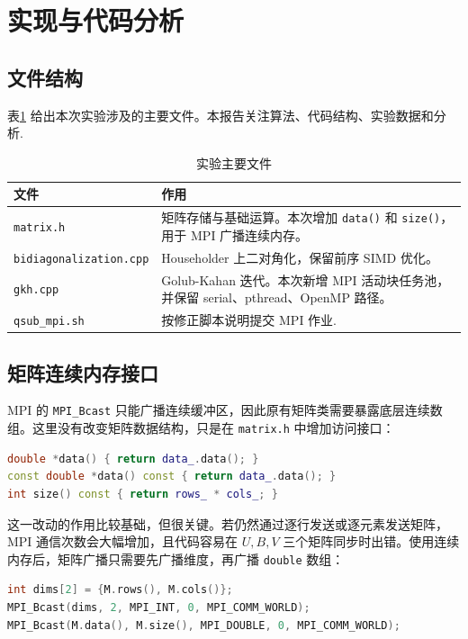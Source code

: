\documentclass[UTF8,a4paper,10pt,fontset=windows]{ctexart}
\begin{document}
\section{实现与代码分析}

\subsection{文件结构}
表\ref{tab:files} 给出本次实验涉及的主要文件。本报告关注算法、代码结构、实验数据和分析.

\begin{table}[H]
\centering
\begin{tabular}{p{}p{}}
\toprule
文件 & 作用 \\
\midrule
\texttt{matrix.h} & 矩阵存储与基础运算。本次增加 \texttt{data()} 和 \texttt{size()}，用于 MPI 广播连续内存。\\
\texttt{bidiagonalization.cpp} & Householder 上二对角化，保留前序 SIMD 优化。\\
\texttt{gkh.cpp} & Golub-Kahan 迭代。本次新增 MPI 活动块任务池，并保留 serial、pthread、OpenMP 路径。\\
\texttt{qsub\_mpi.sh} & 按修正脚本说明提交 MPI 作业.\\
\bottomrule
\end{tabular}
\caption{实验主要文件}
\label{tab:files}
\end{table}

\subsection{矩阵连续内存接口}
MPI 的 \texttt{MPI\_Bcast} 只能广播连续缓冲区，因此原有矩阵类需要暴露底层连续数组。这里没有改变矩阵数据结构，只是在 \texttt{matrix.h} 中增加访问接口：

\begin{lstlisting}[language=C++]
double *data() { return data_.data(); }
const double *data() const { return data_.data(); }
int size() const { return rows_ * cols_; }
\end{lstlisting}

这一改动的作用比较基础，但很关键。若仍然通过逐行发送或逐元素发送矩阵，MPI 通信次数会大幅增加，且代码容易在 $U,B,V$ 三个矩阵同步时出错。使用连续内存后，矩阵广播只需要先广播维度，再广播 \texttt{double} 数组：

\begin{lstlisting}[language=C++]
int dims[2] = {M.rows(), M.cols()};
MPI_Bcast(dims, 2, MPI_INT, 0, MPI_COMM_WORLD);
MPI_Bcast(M.data(), M.size(), MPI_DOUBLE, 0, MPI_COMM_WORLD);
\end{lstlisting}
\end{document}
